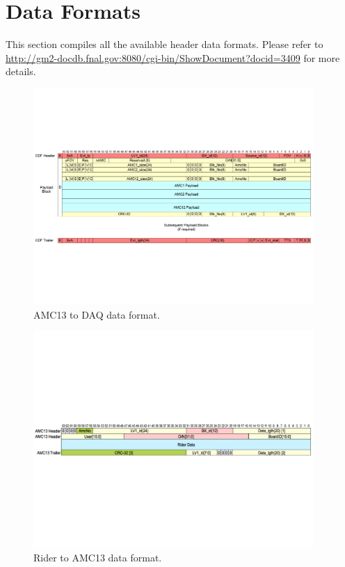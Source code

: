 \documentclass[12pt,letterpaper]{article}
\begin{document}
\newpage
\appendix

\section{Data Formats}

This section compiles all the available header data formats. Please refer to \url{http://gm2-docdb.fnal.gov:8080/cgi-bin/ShowDocument?docid=3409} for more details.

\begin{figure}[htbp]
\centering
\includegraphics[trim=0cm 6cm 0cm 6cm ,width=0.95\textwidth]{pics/AMC13Header}
\caption{AMC13 to DAQ data format.}
\end{figure}

\begin{figure}[htbp]
\centering
\includegraphics[trim=0cm 9.5cm 0cm 9.5cm ,width=0.95\textwidth]{pics/RiderToAMC13Header}
\caption{Rider to AMC13 data format.}
\end{figure}
\end{document}
